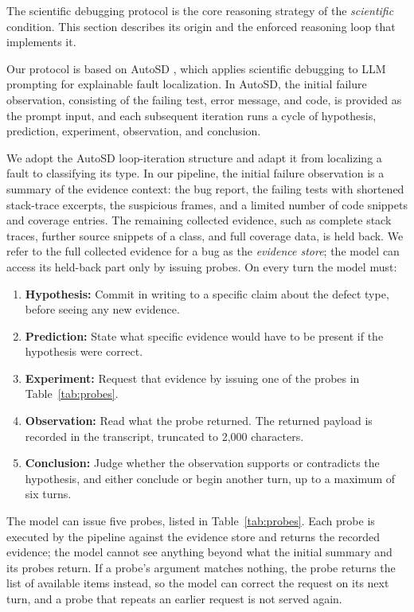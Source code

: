 \documentclass{iutbscthesis}
\begin{document}
The scientific debugging protocol is the core reasoning strategy of the \textit{scientific} condition. This section describes its origin and the enforced reasoning loop that implements it.

Our protocol is based on AutoSD \cite{kang2023autosd}, which applies scientific debugging to LLM prompting for explainable fault localization. In AutoSD, the initial failure observation, consisting of the failing test, error message, and code, is provided as the prompt input, and each subsequent iteration runs a cycle of hypothesis, prediction, experiment, observation, and conclusion.

We adopt the AutoSD loop-iteration structure and adapt it from localizing a fault to classifying its type. In our pipeline, the initial failure observation is a summary of the evidence context: the bug report, the failing tests with shortened stack-trace excerpts, the suspicious frames, and a limited number of code snippets and coverage entries. The remaining collected evidence, such as complete stack traces, further source snippets of a class, and full coverage data, is held back. We refer to the full collected evidence for a bug as the \emph{evidence store}; the model can access its held-back part only by issuing probes. On every turn the model must:

\begin{enumerate}
    \item \textbf{Hypothesis:} Commit in writing to a specific claim about the defect type, before seeing any new evidence.
    \item \textbf{Prediction:} State what specific evidence would have to be present if the hypothesis were correct.
    \item \textbf{Experiment:} Request that evidence by issuing one of the probes in Table~\ref{tab:probes}.
    \item \textbf{Observation:} Read what the probe returned. The returned payload is recorded in the transcript, truncated to 2{,}000 characters.
    \item \textbf{Conclusion:} Judge whether the observation supports or contradicts the hypothesis, and either conclude or begin another turn, up to a maximum of six turns.
\end{enumerate}

The model can issue five probes, listed in Table~\ref{tab:probes}. Each probe is executed by the pipeline against the evidence store and returns the recorded evidence; the model cannot see anything beyond what the initial summary and its probes return. If a probe's argument matches nothing, the probe returns the list of available items instead, so the model can correct the request on its next turn, and a probe that repeats an earlier request is not served again.
\end{document}
